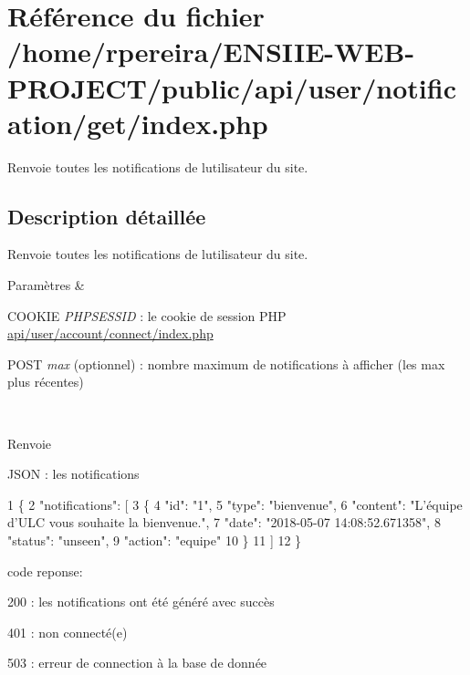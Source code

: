 \hypertarget{user_2notification_2get_2index_8php}{}\section{Référence du fichier /home/rpereira/\+E\+N\+S\+I\+I\+E-\/\+W\+E\+B-\/\+P\+R\+O\+J\+E\+C\+T/public/api/user/notification/get/index.php}
\label{user_2notification_2get_2index_8php}


Renvoie toutes les notifications de l\textquotesingle{}utilisateur du site.  




\subsection{Description détaillée}
Renvoie toutes les notifications de l\textquotesingle{}utilisateur du site. 


\begin{DoxyParams}{Paramètres}
{\em } & 
\begin{DoxyItemize}
\item C\+O\+O\+K\+IE {\itshape P\+H\+P\+S\+E\+S\+S\+ID} \+: le cookie de session P\+HP \hyperlink{user_2account_2connect_2index_8php}{api/user/account/connect/index.\+php}
\item P\+O\+ST {\itshape max} (optionnel) \+: nombre maximum de notifications à afficher (les \textquotesingle{}max\textquotesingle{} plus récentes) 
\end{DoxyItemize}\\
\hline
\end{DoxyParams}
\begin{DoxyReturn}{Renvoie}

\begin{DoxyItemize}
\item J\+S\+ON \+: les notifications 
\begin{DoxyCode}
1 \{
2     "notifications": [
3       \{
4             "id": "1",
5             "type": "bienvenue",
6             "content": "L'équipe d'ULC vous souhaite la bienvenue.",
7             "date": "2018-05-07 14:08:52.671358",
8             "status": "unseen",
9             "action": "equipe"
10         \}
11     ]
12 \}
\end{DoxyCode}

\item code reponse\+:
\begin{DoxyItemize}
\item 200 \+: les notifications ont été généré avec succès
\item 401 \+: non connecté(e)
\item 503 \+: erreur de connection à la base de donnée 
\end{DoxyItemize}
\end{DoxyItemize}
\end{DoxyReturn}
